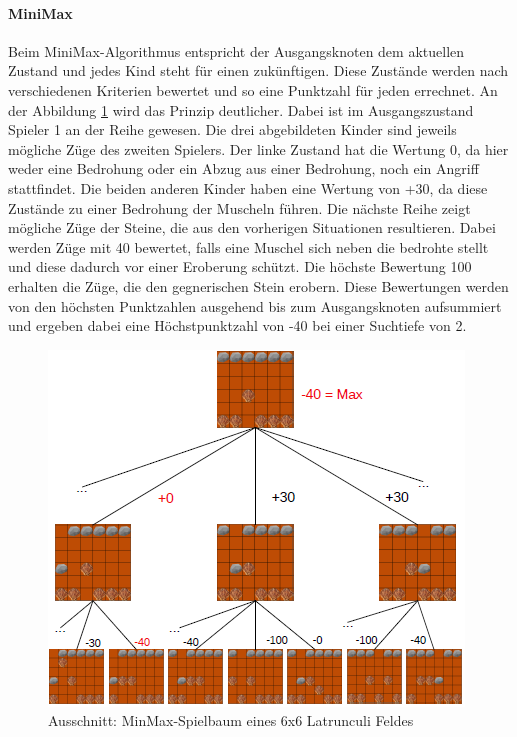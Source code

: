 \paragraph{MiniMax}
Beim MiniMax-Algorithmus entspricht der Ausgangsknoten dem aktuellen Zustand und jedes Kind steht für einen zukünftigen. Diese Zustände werden nach verschiedenen Kriterien bewertet und so eine Punktzahl für jeden errechnet. An der Abbildung \ref{fig:Spielbaum} wird das Prinzip deutlicher. Dabei ist im Ausgangszustand Spieler 1 an der Reihe gewesen. Die drei abgebildeten Kinder sind jeweils mögliche Züge des zweiten Spielers. Der linke Zustand hat die Wertung 0, da hier weder eine Bedrohung oder ein Abzug aus einer Bedrohung, noch ein Angriff stattfindet. Die beiden anderen Kinder haben eine Wertung von +30, da diese Zustände zu einer Bedrohung der Muscheln führen. Die nächste Reihe zeigt mögliche Züge der Steine, die aus den vorherigen Situationen resultieren. Dabei werden Züge mit 40 bewertet, falls eine Muschel sich neben die bedrohte stellt und diese dadurch vor einer Eroberung schützt. Die höchste Bewertung 100 erhalten die Züge, die den gegnerischen Stein erobern. Diese Bewertungen werden von den höchsten Punktzahlen ausgehend bis zum Ausgangsknoten aufsummiert und ergeben dabei eine Höchstpunktzahl von -40 bei einer Suchtiefe von 2. %
\begin{figure}[h]
	\centering
	\includegraphics{img/Spielbaum_latrun4}
	\caption{ Ausschnitt: MinMax-Spielbaum eines 6x6 Latrunculi Feldes}
	\label{fig:Spielbaum}
\end{figure}
